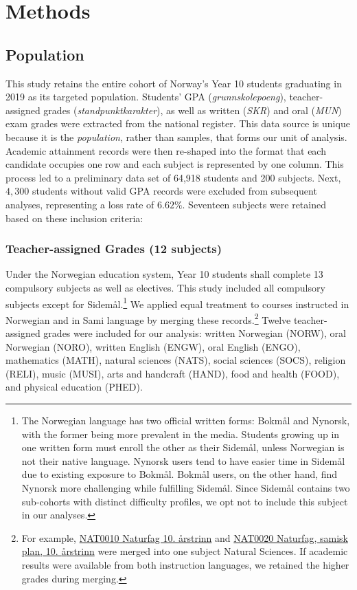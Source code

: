\section{Methods}

\subsection{Population}

This study retains the entire cohort of Norway's Year 10 students graduating in 2019 as its targeted population. Students' GPA (\textit{grunnskolepoeng}), teacher-assigned grades (\textit{standpunktkarakter}), as well as written (\textit{SKR}) and oral (\textit{MUN}) exam grades were extracted from the national register. This data source is unique because it is the \emph{population}, rather than samples, that forms our unit of analysis. Academic attainment records were then re-shaped into the format that each candidate occupies one row and each subject is represented by one column. This process led to a preliminary data set of 64,918 students and 200 subjects. Next, $4,300$ students without valid GPA records were excluded from subsequent analyses, representing a loss rate of $6.62\%$. Seventeen subjects were retained based on these inclusion criteria:

\subsubsection{Teacher-assigned Grades (12 subjects)}

Under the Norwegian education system, Year 10 students shall complete 13 compulsory subjects as well as electives. This study included all compulsory subjects except for Sidem{\aa}l.\footnote{The Norwegian language has two official written forms: Bokm{\aa}l and Nynorsk, with the former being more prevalent in the media. Students growing up in one written form must enroll the other as their Sidem{\aa}l, unless Norwegian is not their native language. Nynorsk users tend to have easier time in Sidem{\aa}l due to existing exposure to Bokm{\aa}l. Bokm{\aa}l users, on the other hand, find Nynorsk more challenging while fulfilling Sidem{\aa}l. Since Sidem{\aa}l contains two sub-cohorts with distinct difficulty profiles, we opt not to include this subject in our analyses.} We applied equal treatment to courses instructed in Norwegian and in Sami language by merging these records.\footnote{For example, \href{https://www.udir.no/kl06/nat0010}{NAT0010 Naturfag 10. {\aa}rstrinn} and \href{https://www.udir.no/kl06/nat0020}{NAT0020 Naturfag, samisk plan, 10. {\aa}rstrinn} were merged into one subject Natural Sciences. If academic results were available from both instruction languages, we retained the higher grades during merging.} Twelve teacher-assigned grades were included for our analysis: written Norwegian (NORW), oral Norwegian (NORO), written English (ENGW), oral English (ENGO), mathematics (MATH), natural sciences (NATS), social sciences (SOCS), religion (RELI), music (MUSI), arts and handcraft (HAND), food and health (FOOD), and physical education (PHED).

